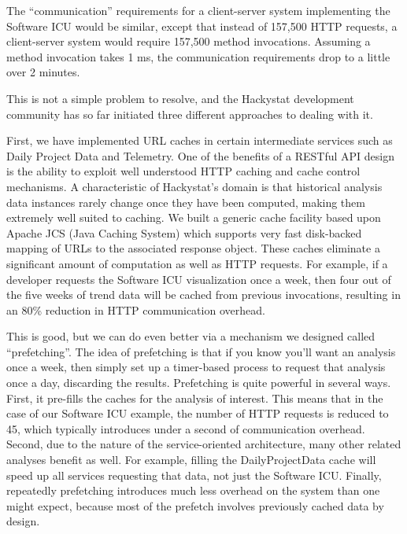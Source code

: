 \documentclass[conference,compsoc]{IEEEtran}
\begin{document}
The ``communication'' requirements for a client-server system implementing
the Software ICU would be similar, except that instead of 157,500 HTTP
requests, a client-server system would require 157,500 method invocations.
Assuming a method invocation takes 1 ms, the communication requirements
drop to a little over 2 minutes.

This is not a simple problem to resolve, and the Hackystat development
community has so far initiated three different approaches to dealing with
it.

First, we have implemented URL caches in certain intermediate services such
as Daily Project Data and Telemetry.  One of the benefits of a RESTful API
design is the ability to exploit well understood HTTP caching and cache
control mechanisms.  A characteristic of Hackystat's domain is that
historical analysis data instances rarely change once they have been
computed, making them extremely well suited to caching.  We built a generic
cache facility based upon Apache JCS (Java Caching System) which supports
very fast disk-backed mapping of URLs to the associated response
object. These caches eliminate a significant amount of computation as well
as HTTP requests.  For example, if a developer requests the Software ICU
visualization once a week, then four out of the five weeks of trend data
will be cached from previous invocations, resulting in an 80\% reduction in
HTTP communication overhead.

This is good, but we can do even better via a mechanism we designed called
``prefetching''.  The idea of prefetching is that if you know you'll want
an analysis once a week, then simply set up a timer-based process to
request that analysis once a day, discarding the results.  Prefetching is
quite powerful in several ways.  First, it pre-fills the caches for the
analysis of interest. This means that in the case of our Software ICU
example, the number of HTTP requests is reduced to 45, which typically introduces under a
second of communication overhead.  Second, due to the nature of the
service-oriented architecture, many other related analyses benefit as
well. For example, filling the DailyProjectData cache will speed up all
services requesting that data, not just the Software ICU.  Finally,
repeatedly prefetching introduces much less overhead on the system than one
might expect, because most of the prefetch involves previously cached data
by design.

\end{document}
